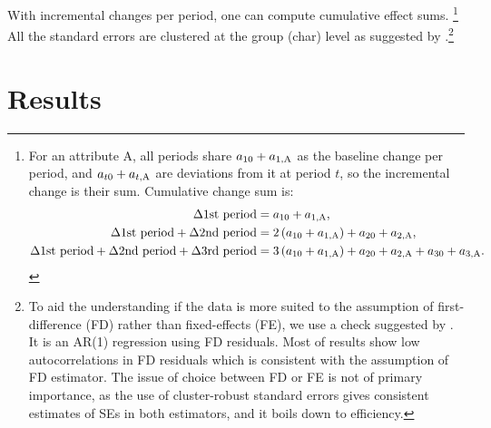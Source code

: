 With incremental changes per period, one can compute cumulative effect sums. \footnote{For an attribute \textsf{A}, all periods share $a_{10}+a_{1, \mbox{\scriptsize A}}$ as the baseline change per period, and $a_{t0}+a_{t, \mbox{\scriptsize A}}$ are deviations from it at period $t$, so the incremental change is their sum. 
Cumulative change sum is:
\[
\begin{aligned}
\Delta\mbox{1st period} 
&= 
a_{10}+a_{1, \mbox{\scriptsize A}},\\
\Delta\mbox{1st period}+\Delta\mbox{2nd period} 
&=
2\left(a_{10}+a_{1, \mbox{\scriptsize A}}\right)+a_{20}+a_{2, \mbox{\scriptsize A}},\\
\Delta\mbox{1st period}+\Delta\mbox{2nd period}+\Delta\mbox{3rd period} 
&= 
3\left(a_{10}+a_{1, \mbox{\scriptsize A}}\right)
+a_{20}+a_{2, \mbox{\scriptsize A}}
+a_{30}+a_{3, \mbox{\scriptsize A}}.
\end{aligned}
\]} All the standard errors are clustered at the group (char) level as suggested by \citet{AbadieAtheyImbensWooldridge2017}.\footnote{To aid the understanding if the data is more suited to the assumption of first-difference (FD) rather than fixed-effects (FE), we use a check suggested by \citet[][10.71]{Wooldridge2010}. It is an AR(1) regression using FD residuals. Most of results show low autocorrelations in FD residuals which is consistent with the assumption of FD estimator. The issue of choice between FD or FE is not of primary importance, as the use of cluster-robust standard errors gives consistent estimates of SEs in both estimators, and it boils down to efficiency.  }


\section{Results}
\label{SecResults}





